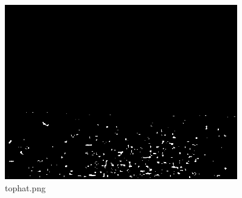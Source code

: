 \documentclass[a4paper,11pt]{article}
\begin{document}
\begin{figure}[p]
	\centering
	\includegraphics[width=0.9\textwidth]{images/morph_transform/tophat.png}
	\caption{tophat.png}
\end{figure}
\clearpage


	
\end{document}
